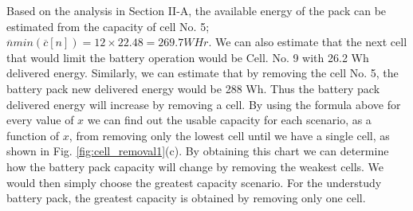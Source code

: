 \documentclass[10pt,twocolumn]{IEEEtran}
\begin{document}
%

Based on the analysis in Section II-A, the available energy of the pack can be estimated from the capacity of cell No.  5; 
$\overline{n} min(\overline{c}[n]) = 12 \times 22.48 = 269. 7 WHr$.
We can also estimate that the next cell that would limit the battery operation would be Cell. No. 9 with 26.2 Wh delivered energy.
Similarly, we can estimate that by removing the cell No. 5, the battery pack new delivered energy would be 288 Wh.
Thus the battery pack delivered energy will increase by removing a cell.
By using the formula above for every value of $x$ we can find out the usable capacity for each scenario, as a function of $x$, from removing only the lowest cell until we have a single cell, as shown in Fig.  \ref{fig:cell_removal1}(c). 
By obtaining this  chart  we can determine how the battery pack capacity will change by removing the weakest cells. 
We would then simply choose the greatest capacity scenario.
For the understudy battery pack, the greatest capacity is obtained by removing only one cell.



%  
\end{document}
